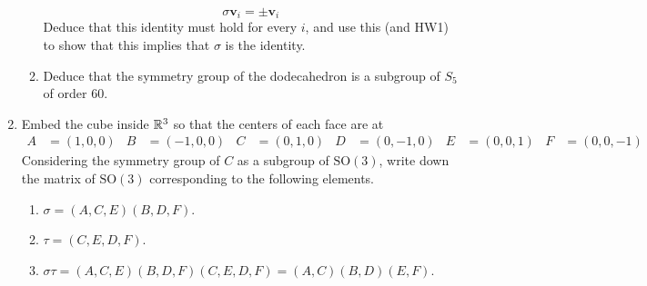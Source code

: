 \documentclass[../psets.tex]{subfiles}
\begin{document}
\begin{enumerate}
\begin{enumerate}
        \begin{equation*}
            \sigma\mathbf{v}_i = \pm\mathbf{v}_i
        \end{equation*}
        Deduce that this identity must hold for every $i$, and use this (and HW1) to show that this implies that $\sigma$ is the identity.
        \item Deduce that the symmetry group of the dodecahedron is a subgroup of $S_5$ of order 60.
    \end{enumerate}
    \item Embed the cube inside $\mathbb{R}^3$ so that the centers of each face are at
    \begin{align*}
        A &= (1,0,0)&
        B &= (-1,0,0)&
        C &= (0,1,0)&
        D &= (0,-1,0)&
        E &= (0,0,1)&
        F &= (0,0,-1)
    \end{align*}
    Considering the symmetry group of $C$ as a subgroup of $\text{SO}(3)$, write down the matrix of $\text{SO}(3)$ corresponding to the following elements.
    \begin{enumerate}
        \item $\sigma=(A,C,E)(B,D,F)$.
        \item $\tau=(C,E,D,F)$.
        \item $\sigma\tau=(A,C,E)(B,D,F)(C,E,D,F)=(A,C)(B,D)(E,F)$.
    \end{enumerate}
\end{enumerate}
\end{document}
